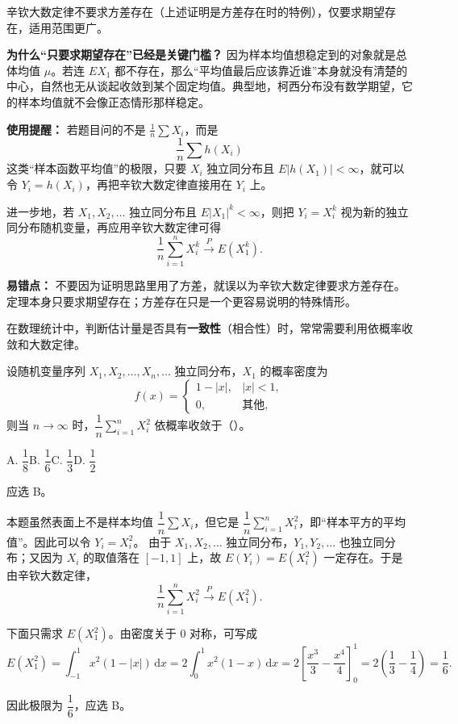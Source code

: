 ﻿\documentclass[lang=cn,11pt]{elegantbook}
\begin{document}
\begin{note}
辛钦大数定律不要求方差存在（上述证明是方差存在时的特例），仅要求期望存在，适用范围更广。

\textbf{为什么“只要求期望存在”已经是关键门槛？} 因为样本均值想稳定到的对象就是总体均值 \(\mu\)。若连 \(EX_1\) 都不存在，那么“平均值最后应该靠近谁”本身就没有清楚的中心，自然也无从谈起收敛到某个固定均值。典型地，柯西分布没有数学期望，它的样本均值就不会像正态情形那样稳定。

\textbf{使用提醒：} 若题目问的不是 \(\frac1n\sum X_i\)，而是
\[
\frac1n\sum h(X_i)
\]
这类“样本函数平均值”的极限，只要 \(X_i\) 独立同分布且 \(E|h(X_1)|<\infty\)，就可以令 \(Y_i=h(X_i)\)，再把辛钦大数定律直接用在 \(Y_i\) 上。

进一步地，若 \(X_1, X_2, \dots\) 独立同分布且 \(E|X_1|^k<\infty\)，则把 \(Y_i=X_i^k\) 视为新的独立同分布随机变量，再应用辛钦大数定律可得
\[
\frac{1}{n}\sum_{i=1}^{n} X_i^k \stackrel{P}{\longrightarrow} E(X_1^k).
\]

\textbf{易错点：} 不要因为证明思路里用了方差，就误以为辛钦大数定律要求方差存在。定理本身只要求期望存在；方差存在只是一个更容易说明的特殊情形。

在数理统计中，判断估计量是否具有\textbf{一致性}（相合性）时，常常需要利用依概率收敛和大数定律。
\end{note}

\begin{exercise}\label{exer:5-khinchin-x2}
设随机变量序列 \(X_1, X_2, \dots, X_n, \dots\) 独立同分布，\(X_1\) 的概率密度为
\[
f(x) = \begin{cases} 1 - |x|, & |x| < 1, \\ 0, & \text{其他}, \end{cases}
\]
则当 \(n \to \infty\) 时，\(\dfrac{1}{n}\displaystyle\sum_{i=1}^{n} X_i^2\) 依概率收敛于（\quad）。\par
A. \(\dfrac{1}{8}\)\quad B. \(\dfrac{1}{6}\)\quad C. \(\dfrac{1}{3}\)\quad D. \(\dfrac{1}{2}\)
\end{exercise}
\begin{solution}
应选 B。

本题虽然表面上不是样本均值 \(\dfrac1n\sum X_i\)，但它是 \(\dfrac1n\sum_{i=1}^n X_i^2\)，即“样本平方的平均值”。因此可以令 \(Y_i=X_i^2\)。
由于 \(X_1,X_2,\dots\) 独立同分布，\(Y_1,Y_2,\dots\) 也独立同分布；又因为 \(X_i\) 的取值落在 \([-1,1]\) 上，故 \(E(Y_i)=E(X_i^2)\) 一定存在。于是由辛钦大数定律，
\[
\frac{1}{n}\sum_{i=1}^{n} X_i^2 \stackrel{P}{\longrightarrow} E(X_1^2).
\]

下面只需求 \(E(X_1^2)\)。由密度关于 0 对称，可写成
\[
E(X_1^2) = \int_{-1}^{1} x^2(1-|x|)\,\mathrm{d}x = 2\int_0^1 x^2(1-x)\,\mathrm{d}x
= 2\!\left[\frac{x^3}{3} - \frac{x^4}{4}\right]_0^1 = 2\!\left(\frac{1}{3}-\frac{1}{4}\right) = \frac{1}{6}.
\]

因此极限为 \(\dfrac16\)，应选 B。
\end{solution}
\end{document}
